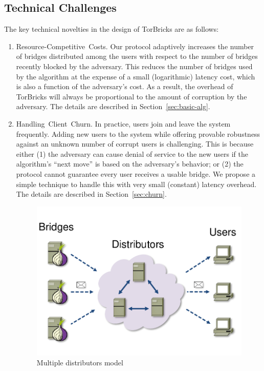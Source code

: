 \documentclass[USenglish,oneside,twocolumn]{article}
\newcommand{\bricks}{}
\def\bricks/{\textsf{\sfsize \mbox{TorBricks}}}
\newcommand{\sfsize}{\fontsize{0.68\baselineskip}{0.68\baselineskip}\selectfont}
\newcommand{\sans}[1]{\textsf{\sfsize \mbox{#1}}}
\begin{document}
\subsection{Technical Challenges} 
The key technical novelties in the design of \bricks/ are as follows:
\begin{enumerate}[leftmargin=1.7em, itemsep=0.7em, topsep=0.6em]
	\item \sans{Resource-Competitive Costs.} Our protocol adaptively increases the number of bridges distributed among the users with respect to the number of bridges recently blocked by the adversary. This reduces the number of bridges used by the algorithm at the expense of a small (logarithmic) latency cost, which is also a function of the adversary's cost. As a result, the overhead of \bricks/ will always be proportional to the amount of corruption by the adversary. The details are described in Section~\ref{sec:basic-alg}.  %
	
	\item \sans{Handling Client Churn.} In practice, users join and leave the system frequently. Adding new users to the system while offering provable robustness against an unknown number of corrupt users is challenging. This is because either (1) the adversary can cause denial of service to the new users if the algorithm's ``next move'' is based on the adversary's behavior; or (2) the protocol cannot guarantee every user receives a usable bridge. We propose a simple technique to handle this with very small (constant) latency overhead. The details are described in Section~\ref{sec:churn}.
	
\begin{figure}[t]
	\centering
	\includegraphics[width=0.7\linewidth]{images/multi-alg}
	\caption{Multiple distributors model}
	\label{fig:multidist}
\end{figure}	
	

\end{enumerate}
\end{document}
